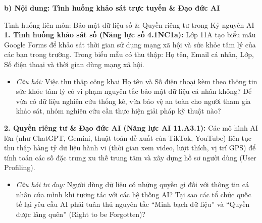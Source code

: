 \documentclass[12pt, a4paper]{article}
\begin{document}
\noindent \textbf{b) Nội dung: Tình huống khảo sát trực tuyến \& Đạo đức AI}
\begin{aibox}{Tình huống liên môn: Bảo mật dữ liệu số \& Quyền riêng tư trong Kỷ nguyên AI}
\textbf{1. Tình huống khảo sát số (Năng lực số 4.1NC1a):}
Lớp 11A tạo biểu mẫu Google Forms để khảo sát thời gian sử dụng mạng xã hội và sức khỏe tâm lý của các bạn trong trường. Trong biểu mẫu có thu thập: Họ tên, Email cá nhân, Lớp, Số điện thoại và thời gian dùng mạng xã hội.
\begin{itemize}[leftmargin=0.6cm]
    \item \textit{Câu hỏi:} Việc thu thập công khai Họ tên và Số điện thoại kèm theo thông tin sức khỏe tâm lý có vi phạm nguyên tắc bảo mật dữ liệu cá nhân không? Để vừa có dữ liệu nghiên cứu thống kê, vừa bảo vệ an toàn cho người tham gia khảo sát, nhóm nghiên cứu cần thực hiện giải pháp kỹ thuật nào?
\end{itemize}
\textbf{2. Quyền riêng tư \& Đạo đức AI (Năng lực AI 11.A3.1):}
Các mô hình AI lớn (như ChatGPT, Gemini, thuật toán đề xuất của TikTok, YouTube) liên tục thu thập hàng tỷ dữ liệu hành vi (thời gian xem video, lượt thích, vị trí GPS) để tính toán các số đặc trưng xu thế trung tâm và xây dựng hồ sơ người dùng (User Profiling).
\begin{itemize}[leftmargin=0.6cm]
    \item \textit{Câu hỏi tư duy:} Người dùng dữ liệu có những quyền gì đối với thông tin cá nhân của mình khi tương tác với các hệ thống AI? Tại sao các tổ chức quốc tế lại yêu cầu AI phải tuân thủ nguyên tắc ``Minh bạch dữ liệu'' và ``Quyền được lãng quên'' (Right to be Forgotten)?
\end{itemize}
\end{aibox}
\end{document}
